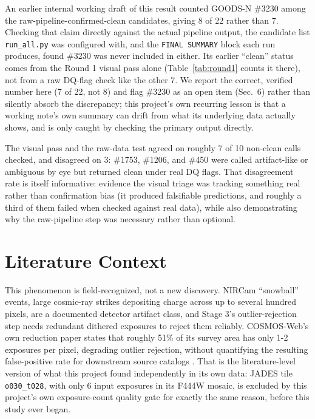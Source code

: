 \documentclass[11pt]{article}
\begin{document}
An earlier internal working draft of this result counted GOODS-N \#3230 among the
raw-pipeline-confirmed-clean candidates, giving 8 of 22 rather than 7. Checking
that claim directly against the actual pipeline output, the candidate list
\texttt{run\_all.py} was configured with, and the \texttt{FINAL SUMMARY} block
each run produces, found \#3230 was never included in either. Its earlier
``clean'' status comes from the Round 1 visual pass alone (Table~\ref{tab:round1}
counts it there), not from a raw DQ-flag check like the other 7. We report the
correct, verified number here (7 of 22, not 8) and flag \#3230 as an open item
(Sec.~6) rather than silently absorb the discrepancy; this project's own
recurring lesson is that a working note's own summary can drift from what its
underlying data actually shows, and is only caught by checking the primary
output directly.

The visual pass and the raw-data test agreed on roughly 7 of 10 non-clean calls
checked, and disagreed on 3: \#1753, \#1206, and \#450 were called artifact-like
or ambiguous by eye but returned clean under real DQ flags. That disagreement
rate is itself informative: evidence the visual triage was tracking something
real rather than confirmation bias (it produced falsifiable predictions, and
roughly a third of them failed when checked against real data), while also
demonstrating why the raw-pipeline step was necessary rather than optional.

\section{Literature Context}

This phenomenon is field-recognized, not a new discovery. NIRCam ``snowball''
events, large cosmic-ray strikes depositing charge across up to several hundred
pixels, are a documented detector artifact class, and Stage 3's outlier-rejection
step needs redundant dithered exposures to reject them reliably. COSMOS-Web's own
reduction paper states that roughly 51\% of its survey area has only 1-2
exposures per pixel, degrading outlier rejection, without quantifying the
resulting false-positive rate for downstream source catalogs \cite{Franco2025}.
That is the literature-level version of what this project found independently in
its own data: JADES tile \texttt{o030\_t028}, with only 6 input exposures in its
F444W mosaic, is excluded by this project's own exposure-count quality gate for
exactly the same reason, before this study ever began.
\end{document}
